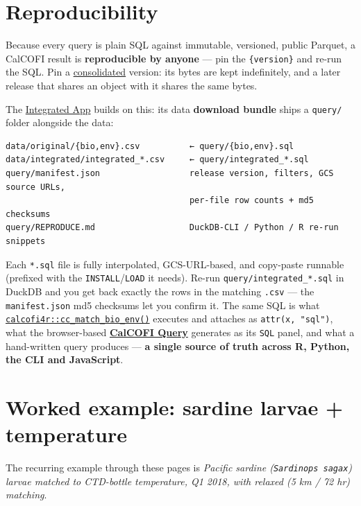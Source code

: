 \documentclass[
  letterpaper,
  DIV=11,
  numbers=noendperiod]{scrreprt}
\begin{document}
\section{Reproducibility}\label{reproducibility}

Because every query is plain SQL against immutable, versioned, public
Parquet, a CalCOFI result is \textbf{reproducible by anyone} --- pin the
\texttt{\{version\}} and re-run the SQL. Pin a
\hyperref[sec-versions]{consolidated} version: its bytes are kept
indefinitely, and a later release that shares an object with it shares
the same bytes.

The \href{https://app.calcofi.io/db-viz-hex}{Integrated App} builds on
this: its data \textbf{download bundle} ships a \texttt{query/} folder
alongside the data:

\begin{verbatim}
data/original/{bio,env}.csv          ← query/{bio,env}.sql
data/integrated/integrated_*.csv     ← query/integrated_*.sql
query/manifest.json                  release version, filters, GCS source URLs,
                                     per-file row counts + md5 checksums
query/REPRODUCE.md                   DuckDB-CLI / Python / R re-run snippets
\end{verbatim}

Each \texttt{*.sql} file is fully interpolated, GCS-URL-based, and
copy-paste runnable (prefixed with the \texttt{INSTALL}/\texttt{LOAD} it
needs). Re-run \texttt{query/integrated\_*.sql} in DuckDB and you get
back exactly the rows in the matching \texttt{.csv} --- the
\texttt{manifest.json} md5 checksums let you confirm it. The same SQL is
what \href{helpers.qmd}{\texttt{calcofi4r::cc\_match\_bio\_env()}}
executes and attaches as \texttt{attr(x,\ "sql")}, what the
browser-based \textbf{\href{https://calcofi.io/db-query/}{CalCOFI
Query}} generates as its \texttt{SQL} panel, and what a hand-written
query produces --- \textbf{a single source of truth across R, Python,
the CLI and JavaScript}.

\section{Worked example: sardine larvae +
temperature}\label{sec-worked-example}

The recurring example through these pages is \emph{Pacific sardine
(\texttt{Sardinops\ sagax}) larvae matched to CTD-bottle temperature, Q1
2018, with relaxed (5 km / 72 hr) matching}.
\end{document}
